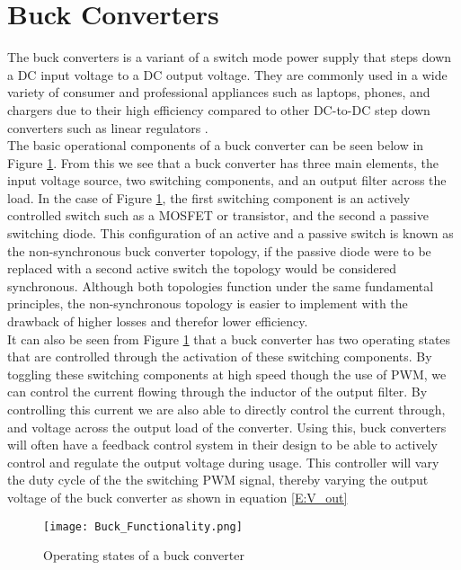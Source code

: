 \section{Buck Converters}\label{S:buck}

The buck converters is a variant of a switch mode power supply that steps down a DC input voltage to a DC output voltage. They are commonly used in a wide variety of consumer and professional appliances such as laptops, phones, and chargers due to their high efficiency compared to other DC-to-DC step down converters such as linear regulators \cite{Mohan2012}.\\

The basic operational components of a buck converter can be seen below in Figure \ref{F:buck_func}. From this we see that a buck converter has three main elements, the input voltage source, two switching components, and an output filter across the load. In the case of Figure \ref{F:buck_func}, the first switching component is an actively controlled switch such as a MOSFET or transistor, and the second a passive switching diode. This configuration of an active and a passive switch is known as the non-synchronous buck converter topology, if the passive diode were to be replaced with a second active switch the topology would be considered synchronous. Although both topologies function under the same fundamental principles, the non-synchronous topology is easier to implement with the drawback of higher losses and therefor lower efficiency.\\

It can also be seen from Figure \ref{F:buck_func} that a buck converter has two operating states that are controlled through the activation of these switching components. By toggling these switching components at high speed though the use of PWM, we can control the current flowing through the inductor of the output filter. By controlling this current we are also able to directly control the current through, and voltage across the output load of the converter. Using this, buck converters will often have a feedback control system in their design to be able to actively control and regulate the output voltage during usage. This controller will vary the duty cycle of the the switching PWM signal, thereby varying the output voltage of the buck converter as shown in equation \ref{E:V_out}\\

\begin{figure}[H]
      \texttt{[image: Buck\_Functionality.png]}
      \caption{Operating states of a buck converter}
      \label{F:buck_func}
  \end{figure}


